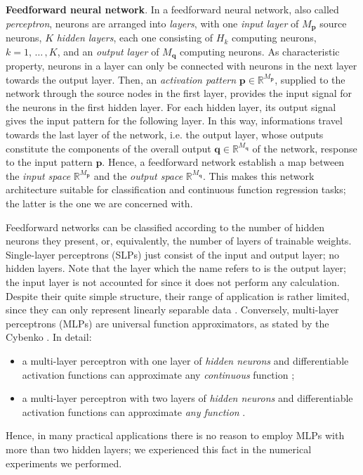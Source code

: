 \documentclass[11pt, a4paper]{report}
\theoremstyle{theorem}
\numberwithin{equation}{section}
\numberwithin{figure}{section}
\begin{document}
		\vspace*{0.3cm}
		
		\noindent \textbf{Feedforward neural network}. In a feedforward neural network, also called \emph{perceptron}, neurons are arranged into \emph{layers}, with one \emph{input layer} of $M_{\boldsymbol{p}}$ source neurons, $K$ \emph{hidden layers}, each one consisting of $H_k$ computing neurons, $k = 1, \, \ldots \, , K$, and an \emph{output layer} of $M_{\boldsymbol{q}}$ computing neurons. As characteristic property, neurons in a layer can only be connected with neurons in the next layer towards the output layer. Then, an \emph{activation pattern} $\boldsymbol{p} \in \mathbb{R}^{M_{\boldsymbol{p}}}$, supplied to the network through the source nodes in the first layer, provides the input signal for the neurons in the first hidden layer. For each hidden layer, its output signal gives the input pattern for the following layer. In this way, informations travel towards the last layer of the network, i.e. the output layer, whose outputs constitute the components of the overall output $\boldsymbol{q} \in \mathbb{R}^{M_{\boldsymbol{q}}}$ of the network, response to the input pattern $\boldsymbol{p}$. Hence, a feedforward network establish a map between the \emph{input space} $\mathbb{R}^{M_{\boldsymbol{p}}}$ and the \emph{output space} $\mathbb{R}^{M_{\boldsymbol{q}}}$. This makes this network architecture suitable for classification and continuous function regression tasks; the latter is the one we are concerned with. 
		
		Feedforward networks can be classified according to the number of hidden neurons they present, or, equivalently, the number of layers of trainable weights. Single-layer perceptrons (SLPs) just consist of the input and output layer; no hidden layers. Note that the layer which the name refers to is the output layer; the input layer is not accounted for since it does not perform any calculation. Despite their quite simple structure, their range of application is rather limited, since they can only represent linearly separable data \cite{Kri}. Conversely, multi-layer perceptrons (MLPs) are universal function approximators, as stated by the Cybenko \cite{Cyb88, Cyb89}. In detail:
		\begin{itemize}
			\item a multi-layer perceptron with one layer of \emph{hidden neurons} and differentiable activation functions can approximate any \emph{continuous} function \cite{Cyb89};
			\item a multi-layer perceptron with two layers of \emph{hidden neurons} and differentiable activation functions can approximate \emph{any function} \cite{Cyb88}.
		\end{itemize}
		Hence, in many practical applications there is no reason to employ MLPs with more than two hidden layers; we experienced this fact in the numerical experiments we performed.
		
\end{document}
